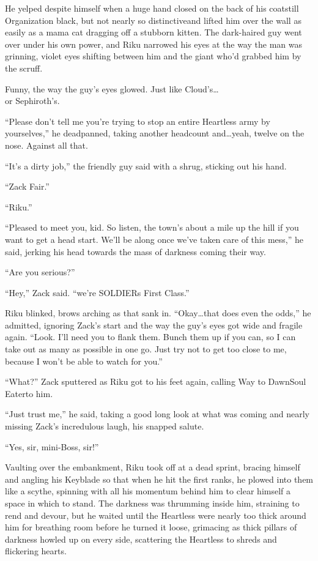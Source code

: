 He yelped despite himself when a huge hand closed on the back of his coat\textemdash still Organization black, but not nearly so distinctive\textemdash and lifted him over the wall as easily as a mama cat dragging off a stubborn kitten. The dark-haired guy went over under his own power, and Riku narrowed his eyes at the way the man was grinning, violet eyes shifting between him and the giant who'd grabbed him by the scruff.

Funny, the way the guy's eyes glowed. Just like Cloud's\ldots\\ or Sephiroth's.

``Please don't tell me you're trying to stop an entire Heartless army by yourselves,'' he deadpanned, taking another headcount and\ldots yeah, twelve on the nose. Against all that.

``It's a dirty job,'' the friendly guy said with a shrug, sticking out his hand. 

``Zack Fair.''

``Riku.''

``Pleased to meet you, kid. So listen, the town's about a mile up the hill if you want to get a head start. We'll be along once we've taken care of this mess,'' he said, jerking his head towards the mass of darkness coming their way.

``Are you serious?''

``Hey,'' Zack said. ``we're SOLDIERs First Class.''

Riku blinked, brows arching as that sank in. ``Okay\ldots that does even the odds,'' he admitted, ignoring Zack's start and the way the guy's eyes got wide and fragile again. ``Look. I'll need you to flank them. Bunch them up if you can, so I can take out as many as possible in one go. Just try not to get too close to me, because I won't be able to watch for you.''

``What?'' Zack sputtered as Riku got to his feet again, calling Way to Dawn\textemdash Soul Eater\textemdash to him.

``Just trust me,'' he said, taking a good long look at what was coming and nearly missing Zack's incredulous laugh, his snapped salute.

``Yes, sir, mini-Boss, sir!''

Vaulting over the embankment, Riku took off at a dead sprint, bracing himself and angling his Keyblade so that when he hit the first ranks, he plowed into them like a scythe, spinning with all his momentum behind him to clear himself a space in which to stand. The darkness was thrumming inside him, straining to rend and devour, but he waited until the Heartless were nearly too thick around him for breathing room before he turned it loose, grimacing as thick pillars of darkness howled up on every side, scattering the Heartless to shreds and flickering hearts.

